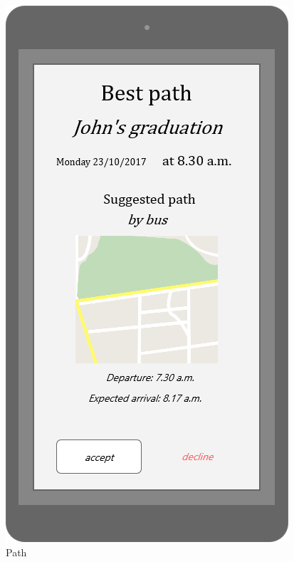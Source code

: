 \documentclass{article}
\begin{document}
\begin{figure}[H]
  \includegraphics[width=\linewidth]{05-Path.png}
  \caption{Path}\label{fig:MU8}
\endminipage\hfill
{}

\end{figure}
\end{document}

